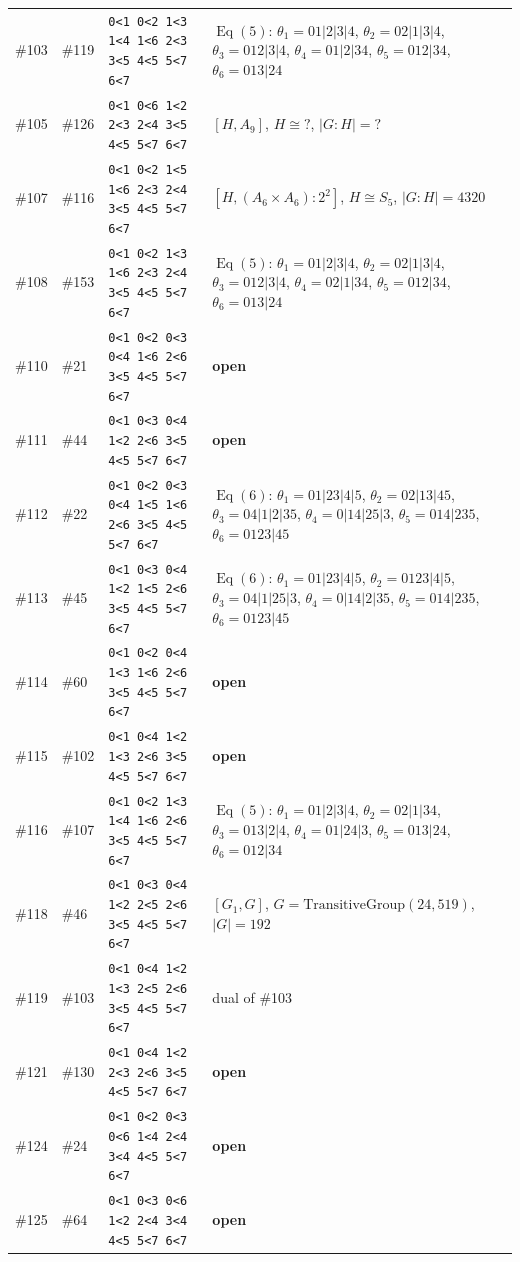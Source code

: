 \documentclass[11pt]{article}
\theoremstyle{remark}
\newcommand{\Eq}{\operatorname{Eq}}
\begin{document}
{\begin{longtable}{@{}l l p{4.9cm} p{7.4cm}@{}}
\#103 & \#119 & \texttt{0<1 0<2 1<3 1<4 1<6 2<3 3<5 4<5 5<7 6<7} & $\Eq(5)$: $\theta_1=01|2|3|4$, $\theta_2=02|1|3|4$, $\theta_3=012|3|4$, $\theta_4=01|2|34$, $\theta_5=012|34$, $\theta_6=013|24$\\
\#105 & \#126 & \texttt{0<1 0<6 1<2 2<3 2<4 3<5 4<5 5<7 6<7} & $[H,A_9]$, $H\cong ?$, $|G:H|=?$\\
\#107 & \#116 & \texttt{0<1 0<2 1<5 1<6 2<3 2<4 3<5 4<5 5<7 6<7} & $[H,(A_6\times A_6){:}2^2]$, $H\cong S_{5}$, $|G:H|=4320$\\
\#108 & \#153 & \texttt{0<1 0<2 1<3 1<6 2<3 2<4 3<5 4<5 5<7 6<7} & $\Eq(5)$: $\theta_1=01|2|3|4$, $\theta_2=02|1|3|4$, $\theta_3=012|3|4$, $\theta_4=02|1|34$, $\theta_5=012|34$, $\theta_6=013|24$\\
\#110 & \#21 & \texttt{0<1 0<2 0<3 0<4 1<6 2<6 3<5 4<5 5<7 6<7} & \textbf{open}\\
\#111 & \#44 & \texttt{0<1 0<3 0<4 1<2 2<6 3<5 4<5 5<7 6<7} & \textbf{open}\\
\#112 & \#22 & \texttt{0<1 0<2 0<3 0<4 1<5 1<6 2<6 3<5 4<5 5<7 6<7} & $\Eq(6)$: $\theta_1=01|23|4|5$, $\theta_2=02|13|45$, $\theta_3=04|1|2|35$, $\theta_4=0|14|25|3$, $\theta_5=014|235$, $\theta_6=0123|45$\\
\#113 & \#45 & \texttt{0<1 0<3 0<4 1<2 1<5 2<6 3<5 4<5 5<7 6<7} & $\Eq(6)$: $\theta_1=01|23|4|5$, $\theta_2=0123|4|5$, $\theta_3=04|1|25|3$, $\theta_4=0|14|2|35$, $\theta_5=014|235$, $\theta_6=0123|45$\\
\#114 & \#60 & \texttt{0<1 0<2 0<4 1<3 1<6 2<6 3<5 4<5 5<7 6<7} & \textbf{open}\\
\#115 & \#102 & \texttt{0<1 0<4 1<2 1<3 2<6 3<5 4<5 5<7 6<7} & \textbf{open}\\
\#116 & \#107 & \texttt{0<1 0<2 1<3 1<4 1<6 2<6 3<5 4<5 5<7 6<7} & $\Eq(5)$: $\theta_1=01|2|3|4$, $\theta_2=02|1|34$, $\theta_3=013|2|4$, $\theta_4=01|24|3$, $\theta_5=013|24$, $\theta_6=012|34$\\
\#118 & \#46 & \texttt{0<1 0<3 0<4 1<2 2<5 2<6 3<5 4<5 5<7 6<7} & $[G_1,G]$, $G=\mathrm{TransitiveGroup}(24,519)$, $|G|=192$\\
\#119 & \#103 & \texttt{0<1 0<4 1<2 1<3 2<5 2<6 3<5 4<5 5<7 6<7} & dual of \#103\\
\#121 & \#130 & \texttt{0<1 0<4 1<2 2<3 2<6 3<5 4<5 5<7 6<7} & \textbf{open}\\
\#124 & \#24 & \texttt{0<1 0<2 0<3 0<6 1<4 2<4 3<4 4<5 5<7 6<7} & \textbf{open}\\
\#125 & \#64 & \texttt{0<1 0<3 0<6 1<2 2<4 3<4 4<5 5<7 6<7} & \textbf{open}\\

\end{longtable}}
\end{document}
